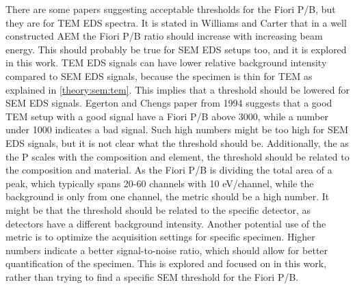 There are some papers \cite{egerton_nio_characterization_1994,egerton_nio_characterization_1994,ted_pella_nio_tem_2019} suggesting acceptable thresholds for the Fiori P/B, but they are for TEM EDS spectra.
It is stated in Williams and Carter \cite[p. 614]{williams_carter_tem_2009} that in a well constructed AEM the Fiori P/B ratio should increase with increasing beam energy.
This should probably be true for SEM EDS setups too, and it is explored in this work.
TEM EDS signals can have lower relative background intensity compared to SEM EDS signals, because the specimen is thin for TEM as explained in \cref{theory:sem:tem}.
This implies that a threshold should be lowered for SEM EDS signals.
Egerton and Chengs paper from 1994 \cite{egerton_nio_characterization_1994} suggests that a good TEM setup with a good signal have a Fiori P/B above 3000, while a number under 1000 indicates a bad signal.
Such high numbers might be too high for SEM EDS signals, but it is not clear what the threshold should be.
Additionally, the as the P scales with the composition and element, the threshold should be related to the composition and material.
As the Fiori P/B is dividing the total area of a peak, which typically spans 20-60 channels with 10 eV/channel, while the background is only from one channel, the metric should be a high number.
It might be that the threshold should be related to the specific detector, as detectors have a different background intensity.
Another potential use of the metric is to optimize the acquisition settings for specific specimen.
Higher numbers indicate a better signal-to-noise ratio, which should allow for better quantification of the specimen.
This is explored and focused on in this work, rather than trying to find a specific SEM threshold for the Fiori P/B.









